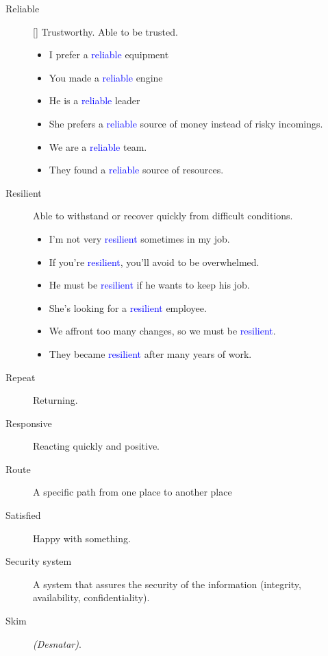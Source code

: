 \begin{multicols}{2}
\begin{description}
\item[Reliable] [\emph{}] Trustworthy. Able to be trusted.
\begin{itemize}
\item I prefer a \textcolor{blue}{reliable} equipment
\item You made a \textcolor{blue}{reliable} engine
\item He is a \textcolor{blue}{reliable} leader
\item She prefers a \textcolor{blue}{reliable} source of money instead of risky incomings.
\item We are a \textcolor{blue}{reliable} team.
\item They found a \textcolor{blue}{reliable} source of resources.	
\end{itemize}

\item[Resilient] Able to withstand or recover quickly from difficult conditions.
\begin{itemize}
\item I'm not very \textcolor{blue}{resilient} sometimes in my job.
\item If you're \textcolor{blue}{resilient}, you'll avoid to be overwhelmed.
\item He must be \textcolor{blue}{resilient} if he wants to keep his job.
\item She's looking for a \textcolor{blue}{resilient} employee.
\item We affront too many changes, so we must be \textcolor{blue}{resilient}.
\item They became \textcolor{blue}{resilient} after many years of work.
\end{itemize}

\item[Repeat] Returning.

\item[Responsive] Reacting quickly and positive.

\item[Route] A specific path from one place to another place

\item[Satisfied] Happy with something.

\item[Security system] A system that assures the security of the information (integrity, availability, confidentiality).

\item[Skim] \emph{(Desnatar)}.


\end{description}
\end{multicols}
